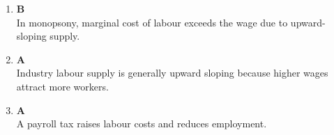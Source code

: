 \documentclass[12pt]{article}
\begin{document}
\begin{enumerate}
Answer A reflects the idea that:

\begin{quote}
A firm can reduce wages \textbf{without losing workers}, as long as wages remain above the reservation wage.
\end{quote}

This is the defining property of economic rents:
\begin{itemize}
    \item Firms have some flexibility to lower wages.
    \item Workers do not leave immediately because they are still better off than their next best alternative.
\end{itemize}

\subsection*{Why Answer D is Incorrect}

Answer D states that workers would leave if wages are reduced. This is incorrect because:

\begin{itemize}
    \item Workers only leave when:
    \[
    W < W^{R}
    \]
    \item A small wage reduction \textbf{within the rent margin} does not trigger exit.
\end{itemize}

Thus, Answer D ignores the key concept of a \textbf{reservation wage threshold}.

\subsection*{Conclusion}

\[
\boxed{
\text{Economic rents imply that wages can fall without reducing employment, as long as } W \geq W^{R}.
}
\]

Therefore, \textbf{Answer A is correct}.

\item \textbf{B} \\
In monopsony, marginal cost of labour exceeds the wage due to upward-sloping supply.

\item \textbf{A} \\
Industry labour supply is generally upward sloping because higher wages attract more workers.

\item \textbf{A} \\
A payroll tax raises labour costs and reduces employment.


\end{enumerate}
\end{document}
